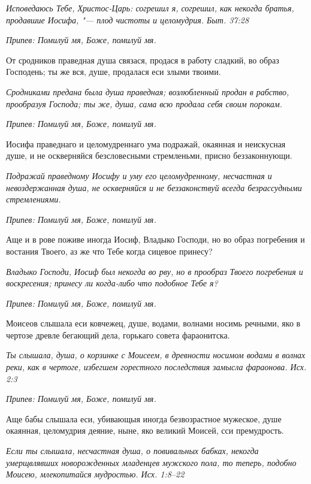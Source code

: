 \itshape Исповедаюсь Тебе, Христос-Царь: согрешил я, согрешил, как некогда братья, продавшие Иосифа, "--- плод чистоты и целомудрия. Быт. 37:28\normalfont{}


\itshape Припев:\normalfont{} Помилуй мя, Боже, помилуй мя.


От сродников праведная душа связася, продася в работу сладкий, во образ Господень; ты же вся, душе, продалася еси злыми твоими.


\itshape Сродниками предана была душа праведная; возлюбленный продан в рабство, прообразуя Господа; ты же, душа, сама всю продала себя своим порокам.\normalfont{}


\itshape Припев:\normalfont{} Помилуй мя, Боже, помилуй мя.


Иосифа праведнаго и целомудреннаго ума подражай, окаянная и неискусная душе, и не оскверняйся безсловесными стремленьми, присно беззаконнующи.


\itshape Подражай праведному Иосифу и уму его целомудренному, несчастная и невоздержанная душа, не оскверняйся и не беззаконствуй всегда безрассудными стремлениями.\normalfont{}


\itshape Припев:\normalfont{} Помилуй мя, Боже, помилуй мя.


Аще и в рове поживе иногда Иосиф, Владыко Господи, но во образ погребения и востания Твоего, аз же что Тебе когда сицевое принесу?


\itshape Владыко Господи, Иосиф был некогда во рву, но в прообраз Твоего погребения и воскресения; принесу ли когда-либо что подобное Тебе я?\normalfont{}


\itshape Припев:\normalfont{} Помилуй мя, Боже, помилуй мя.


Моисеов слышала еси ковчежец, душе, водами, волнами носимь речными, яко в чертозе древле бегающий дела, горькаго совета фараонитска.


\itshape Ты слышала, душа, о корзинке с Моисеем, в древности носимом водами в волнах реки, как в чертоге, избегшем горестного последствия замысла фараонова. Исх. 2:3\normalfont{}


\itshape Припев:\normalfont{} Помилуй мя, Боже, помилуй мя.


Аще бабы слышала еси, убивающыя иногда безвозрастное мужеское, душе окаянная, целомудрия деяние, ныне, яко великий Моисей, сси премудрость.


\itshape Если ты слышала, несчастная душа, о повивальных бабках, некогда умерщвлявших новорожденных младенцев мужского пола, то теперь, подобно Моисею, млекопитайся мудростью. Исх. 1:8–22\normalfont{}


